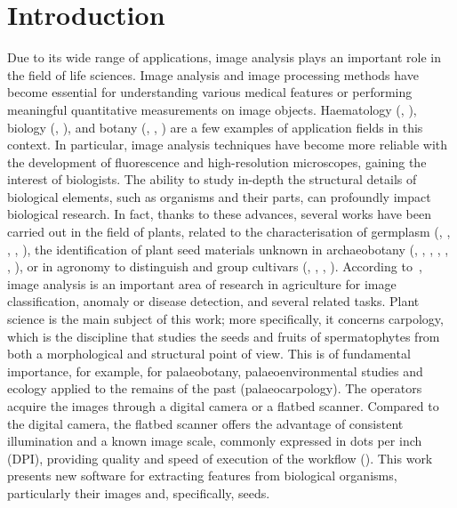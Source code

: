 \documentclass[twocolumn]{svjour3}           %
\begin{document}

\section{Introduction}
\label{sec:intro}
Due to its wide range of applications, image analysis plays an important role in the field of life sciences. Image analysis and image processing methods have become essential for understanding various medical features or performing meaningful quantitative measurements on image objects. Haematology (\cite{Dirub2020}, \cite{Remeseiro2021}), biology (\cite{Campanile19}, \cite{Ahmad2021}), and botany (\cite{bohl2015modeling}, \cite{LoBianco2017a}, \cite{hu2017data}) are a few examples of application fields in this context. 
%
In particular, image analysis techniques have become more reliable with the development of fluorescence and high-resolution microscopes, gaining the interest of biologists. The ability to study in-depth the structural details of biological elements, such as organisms and their parts, can profoundly impact biological research. In fact, thanks to these advances, several works have been carried out in the field of plants, related to the characterisation of germplasm (\cite{Bacchetta2011a}, \cite{Frigau2019}, \cite{LoBianco2015}, \cite{LoBianco2017a}, \cite{LoBianco2017b}), the identification of plant seed materials unknown in archaeobotany (\cite{Bouby2013}, \cite{Orru2013}, \cite{Terral2010}, \cite{Sabato2015}, \cite{Ucc2015}, \cite{Ucc2016}, \cite{Ucc2017}), or in agronomy to distinguish and group cultivars (\cite{Piras2016}, \cite{Sarigu2017}, \cite{Sau2018}, \cite{Sau2019}). According to~\cite{Kamilaris}, image analysis is an important area of research in agriculture for image classification, anomaly or disease detection, and several related tasks.
%
Plant science is the main subject of this work; more specifically, it concerns carpology, which is the discipline that studies the seeds and fruits of spermatophytes from both a morphological and structural point of view. This is of fundamental importance, for example, for palaeobotany, palaeoenvironmental studies and ecology applied to the remains of the past (palaeocarpology). The operators acquire the images through a digital camera or a flatbed scanner. Compared to the digital camera, the flatbed scanner offers the advantage of consistent illumination and a known image scale, commonly expressed in dots per inch (DPI), providing quality and speed of execution of the workflow (\cite{Lind2012}). This work presents new software for extracting features from biological organisms, particularly their images and, specifically, seeds.
\end{document}

